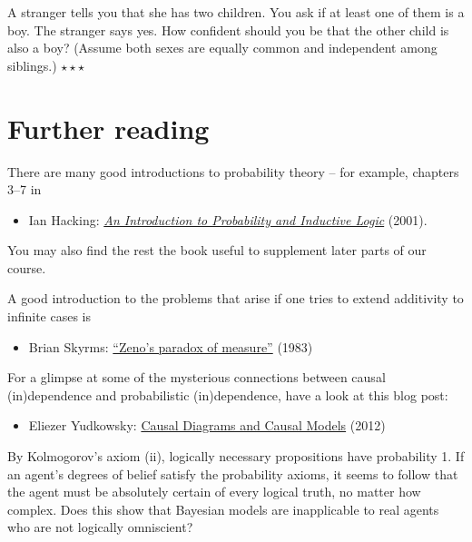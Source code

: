 
\begin{exercise}
  A stranger tells you that she has two children. You ask if at least
  one of them is a boy. The stranger says yes. How confident should
  you be that the other child is also a boy? (Assume both sexes are
  equally common and independent among siblings.) $\star\star\star$
\end{exercise}


\section{Further reading}

There are many good introductions to probability theory -- for
example, chapters 3--7 in
%
\begin{itemize}
\item Ian Hacking: \href{http://fitelson.org/confirmation/hacking_introduction_to_probability_and_inductive_logic.pdf}{\emph{An Introduction to Probability and Inductive Logic}} (2001).
\end{itemize}
%
You may also find the rest the book useful to supplement later parts
of our course.

A good introduction to the problems that arise if one tries to extend
additivity to infinite cases is
%
\begin{itemize}
\item Brian Skyrms: \href{http://joelvelasco.net/teaching/3865/skyrms\%2083\%20-\%20zeno\%27s\%20paradox\%20of\%20measure.pdf}{``Zeno's paradox of measure''} (1983)
\end{itemize}

For a glimpse at some of the mysterious connections between causal
(in)dependence and probabilistic (in)dependence, have a look at this
blog post:
%
\begin{itemize}
\item Eliezer Yudkowsky: \href{http://lesswrong.com/lw/ev3/causal_diagrams_and_causal_models/}{Causal Diagrams and Causal Models} (2012)
\end{itemize}


\begin{essay}
  By Kolmogorov's axiom (ii), logically necessary propositions have
  probability 1. If an agent's degrees of belief satisfy the
  probability axioms, it seems to follow that the agent must be
  absolutely certain of every logical truth, no matter how
  complex. Does this show that Bayesian models are inapplicable to
  real agents who are not logically omniscient?
\end{essay}

